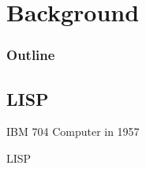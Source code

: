 \documentclass[aspectratio=169,usenames,dvipsnames]{beamer}
\begin{document}
\section{Background}
    \begin{frame}
    \frametitle{Outline}
    \begin{minipage}{0.25\textwidth}
    \mbox{}
    \end{minipage}
    \begin{minipage}{0.6\textwidth}
    \tableofcontents[hideallsubsections]
    \end{minipage}
    \end{frame}

    \subsection{LISP}
\begin{frame}[plain]
\hfill        {\small\color{white}IBM 704 Computer in 1957}
\vfill\vfill\vfill\vfill\vfill
\begin{minipage}[c]{0.5\textwidth}
        \pause
        \begin{center}
        \vspace*{2ex}
        \Huge LISP
        \vspace*{1ex}
        \end{center}
        \oldEndBlock
\end{minipage}\hfill


\end{frame}
\end{document}
